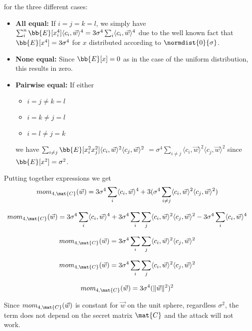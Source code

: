     for the three different cases:
    \begin{itemize}
        \item \textbf{All equal: } If $i = j = k = l$, we simply have $\sum_i^n \bb{E}[x_i^4] \langle c_i, \vec{w} \rangle ^4 = 3 \sigma ^4 \sum_i \langle c_i, \vec{w} \rangle ^4$
            due to the well known fact that $\bb{E}[x^4] = 3 \sigma ^4$ for $x$ distributed according to $\normdist{0}{\sigma}$.
        \item \textbf{None equal:} Since $\bb{E}[x] = 0$ as in the case of the uniform distribution, this results in zero.
        \item \textbf{Pairwise equal:} If either 
            \begin{itemize}
                \item $i = j \neq k = l$
                \item $i = k \neq j = l$ 
                \item $i = l \neq j = k$
            \end{itemize}
            we have $\sum_{i \neq j} \bb{E}[x_i^2 x_j^2] \langle c_i, \vec{w} \rangle ^2 \langle c_j, \vec{w} \rangle ^2$
            $= \sigma^4 \sum_{i \neq j}\langle c_i, \vec{w} \rangle ^2 \langle c_j, \vec{w} \rangle ^2$ since $\bb{E}[x^2] = \sigma^2$.
    \end{itemize}

    Putting together expressions we get 
    \[
        mom_{4, \mat{C}}(\vec{w}) = 3 \sigma ^4 \sum_i \langle c_i, \vec{w} \rangle ^4 + 3(\sigma^4 \sum_{i \neq j}\langle c_i, \vec{w} \rangle ^2 \langle c_j, \vec{w} \rangle ^2)
    \]

    \[
        mom_{4, \mat{C}}(\vec{w}) = 3 \sigma ^4 \sum_i \langle c_i, \vec{w} \rangle ^4 
        + 3\sigma^4 \sum_{i} \sum_{j} \langle c_i, \vec{w} \rangle ^2 \langle c_j, \vec{w} \rangle ^2
        - 3\sigma^4 \sum_{i} \langle c_i, \vec{w} \rangle ^4
    \]

    \[
        mom_{4, \mat{C}}(\vec{w}) = 3\sigma^4 \sum_{i} \sum_{j} \langle c_i, \vec{w} \rangle ^2 \langle c_j, \vec{w} \rangle ^2
    \]

    \[
        mom_{4, \mat{C}}(\vec{w}) = 3\sigma^4 \sum_{i} \sum_{j} \langle c_i, \vec{w} \rangle ^2 \langle c_j, \vec{w} \rangle ^2
    \]

    \[
        mom_{4, \mat{C}}(\vec{w}) = 3\sigma^4 (\lVert \vec{w} \rVert ^2 ) ^2
    \]

    Since $mom_{4, \mat{C}}(\vec{w})$ is constant for $\vec{w}$ on the unit sphere, regardless $\sigma^2$, the term does not depend on the secret matrix $\mat{C}$ and the attack will not work.
